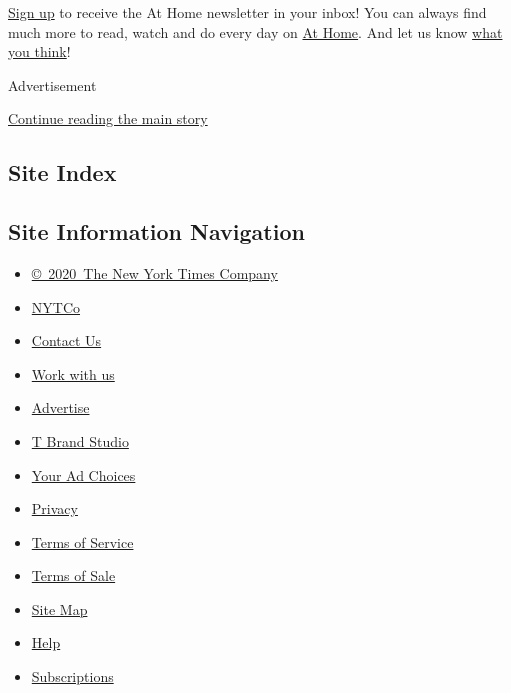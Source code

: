 \href{https://www.nytimes.com/newsletters/at-home}{Sign up} to receive
the At Home newsletter in your inbox! You can always find much more to
read, watch and do every day on
\href{https://www.nytimes.com/spotlight/at-home}{At Home}. And let us
know \href{https://nyt.qualtrics.com/jfe/form/SV_e9cKGVFtci4CObz}{what
you think}!

Advertisement

\protect\hyperlink{after-bottom}{Continue reading the main story}

\hypertarget{site-index}{%
\subsection{Site Index}\label{site-index}}

\hypertarget{site-information-navigation}{%
\subsection{Site Information
Navigation}\label{site-information-navigation}}

\begin{itemize}
\tightlist
\item
  \href{https://help.nytimes.com/hc/en-us/articles/115014792127-Copyright-notice}{©~2020~The
  New York Times Company}
\end{itemize}

\begin{itemize}
\tightlist
\item
  \href{https://www.nytco.com/}{NYTCo}
\item
  \href{https://help.nytimes.com/hc/en-us/articles/115015385887-Contact-Us}{Contact
  Us}
\item
  \href{https://www.nytco.com/careers/}{Work with us}
\item
  \href{https://nytmediakit.com/}{Advertise}
\item
  \href{http://www.tbrandstudio.com/}{T Brand Studio}
\item
  \href{https://www.nytimes.com/privacy/cookie-policy\#how-do-i-manage-trackers}{Your
  Ad Choices}
\item
  \href{https://www.nytimes.com/privacy}{Privacy}
\item
  \href{https://help.nytimes.com/hc/en-us/articles/115014893428-Terms-of-service}{Terms
  of Service}
\item
  \href{https://help.nytimes.com/hc/en-us/articles/115014893968-Terms-of-sale}{Terms
  of Sale}
\item
  \href{https://spiderbites.nytimes.com}{Site Map}
\item
  \href{https://help.nytimes.com/hc/en-us}{Help}
\item
  \href{https://www.nytimes.com/subscription?campaignId=37WXW}{Subscriptions}
\end{itemize}
